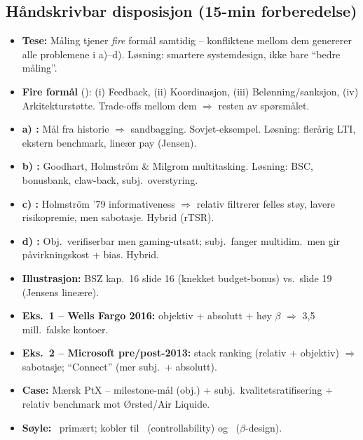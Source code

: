 \subsection*{Håndskrivbar disposisjon (15-min forberedelse)}
\begin{itemize}\setlength{\itemsep}{2pt}
\item \textbf{Tese:} Måling tjener \emph{fire} formål samtidig -- konfliktene mellom dem genererer alle problemene i a)--d). Løsning: smartere systemdesign, ikke bare ``bedre måling''.
\item \textbf{Fire formål} (): (i) Feedback, (ii) Koordinasjon, (iii) Belønning/sanksjon, (iv) Arkitekturstøtte. Trade-offs mellom dem $\Rightarrow$ resten av spørsmålet.
\item \textbf{a) :} Mål fra historie $\Rightarrow$ sandbagging. Sovjet-eksempel. Løsning: flerårig LTI, ekstern benchmark, lineær pay (Jensen).
\item \textbf{b) :} Goodhart, Holmström \& Milgrom multitasking. Løsning: BSC, bonusbank, claw-back, subj.\ overstyring.
\item \textbf{c) :} Holmström '79 informativeness $\Rightarrow$ relativ filtrerer felles støy, lavere risikopremie, men sabotasje. Hybrid (rTSR).
\item \textbf{d) :} Obj.\ verifiserbar men gaming-utsatt; subj.\ fanger multidim.\ men gir påvirkningskost + bias. Hybrid.
\item \textbf{Illustrasjon:} BSZ kap.\ 16 slide 16 (knekket budget-bonus) vs.\ slide 19 (Jensens lineære).
\item \textbf{Eks.\ 1 -- Wells Fargo 2016:} objektiv + absolutt + høy $\beta$ $\Rightarrow$ 3,5 mill.\ falske kontoer.
\item \textbf{Eks.\ 2 -- Microsoft pre/post-2013:} stack ranking (relativ + objektiv) $\Rightarrow$ sabotasje; ``Connect'' (mer subj.\ + absolutt).
\item \textbf{Case:} Mærsk PtX -- milestone-mål (obj.) + subj.\ kvalitetsratifisering + relativ benchmark mot Ørsted/Air Liquide.
\item \textbf{Søyle:} \STwo\ primært; kobler til \SOne\ (controllability) og \SThree\ ($\beta$-design).
\end{itemize}
